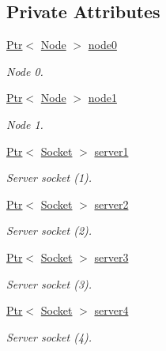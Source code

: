 \subsection*{Private Attributes}
\begin{DoxyCompactItemize}
\item 
\hyperlink{classns3_1_1Ptr}{Ptr}$<$ \hyperlink{classns3_1_1Node}{Node} $>$ \hyperlink{classDualStackTestCase_ac4d4f4cf97719a9909db6702bb6363b6}{node0}
\begin{DoxyCompactList}\small\item\em Node 0. \end{DoxyCompactList}\item 
\hyperlink{classns3_1_1Ptr}{Ptr}$<$ \hyperlink{classns3_1_1Node}{Node} $>$ \hyperlink{classDualStackTestCase_a5d42040da6dd2355e2257bab489d2e08}{node1}
\begin{DoxyCompactList}\small\item\em Node 1. \end{DoxyCompactList}\item 
\hyperlink{classns3_1_1Ptr}{Ptr}$<$ \hyperlink{classns3_1_1Socket}{Socket} $>$ \hyperlink{classDualStackTestCase_a62071fab4c4a34e21db3fa485912aecd}{server1}
\begin{DoxyCompactList}\small\item\em Server socket (1). \end{DoxyCompactList}\item 
\hyperlink{classns3_1_1Ptr}{Ptr}$<$ \hyperlink{classns3_1_1Socket}{Socket} $>$ \hyperlink{classDualStackTestCase_a1dec50c747b9b140513d695e4dd3aef6}{server2}
\begin{DoxyCompactList}\small\item\em Server socket (2). \end{DoxyCompactList}\item 
\hyperlink{classns3_1_1Ptr}{Ptr}$<$ \hyperlink{classns3_1_1Socket}{Socket} $>$ \hyperlink{classDualStackTestCase_a35f3bc681d2fc1f54a5a5e7c5530c2da}{server3}
\begin{DoxyCompactList}\small\item\em Server socket (3). \end{DoxyCompactList}\item 
\hyperlink{classns3_1_1Ptr}{Ptr}$<$ \hyperlink{classns3_1_1Socket}{Socket} $>$ \hyperlink{classDualStackTestCase_a151f957a3f71c91cda6ea65e11e5499e}{server4}
\begin{DoxyCompactList}\small\item\em Server socket (4). \end{DoxyCompactList}\item 

\end{DoxyCompactItemize}
